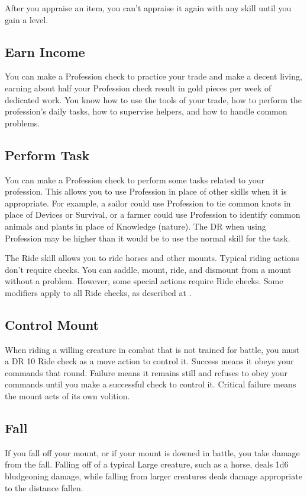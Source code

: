        After you appraise an item, you can't appraise it again with any skill until you gain a level.

    \subsection{Earn Income}
        You can make a Profession check to practice your trade and make a decent living, earning about half your Profession check result in gold pieces per week of dedicated work. You know how to use the tools of your trade, how to perform the profession's daily tasks, how to supervise helpers, and how to handle common problems.

    \subsection{Perform Task}
        You can make a Profession check to perform some tasks related to your profession. This allows you to use Profession in place of other skills when it is appropriate. For example, a sailor could use Profession to tie common knots in place of Devices or Survival, or a farmer could use Profession to identify common animals and plants in place of Knowledge (nature). The DR when using Profession may be higher than it would be to use the normal skill for the task.

\newpage
{}
        The Ride skill allows you to ride horses and other mounts. Typical riding actions don't require checks. You can saddle, mount, ride, and dismount from a mount without a problem. However, some special actions require Ride checks. Some modifiers apply to all Ride checks, as described at .

    \subsection{Control Mount}
        When riding a willing creature in combat that is not trained for battle, you must a DR 10 Ride check as a move action to control it. Success means it obeys your commands that round. Failure means it remains still and refuses to obey your commands until you make a successful check to control it. Critical failure means the mount acts of its own volition.

    \subsection{Fall}
        If you fall off your mount, or if your mount is downed in battle, you take damage from the fall.
        Falling off of a typical Large creature, such as a horse, deals 1d6 bludgeoning damage, while falling from larger creatures deals damage appropriate to the distance fallen.


